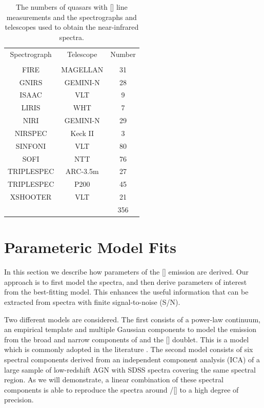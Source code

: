 \begin{table}
  \centering
  \small 
  \caption{The numbers of quasars with [] line measurements and the spectrographs and telescopes used to obtain the near-infrared spectra.}
  \label{tab:specnums}
    \begin{tabular}{ccc} 
    \hline
    Spectrograph & Telescope & Number \\
                 &           & \\
    \hline
    FIRE         & MAGELLAN  & 31 \\
    GNIRS        & GEMINI-N  & 28 \\
    ISAAC        & VLT       & 9 \\
    LIRIS        & WHT       & 7 \\
    NIRI         & GEMINI-N  & 29 \\
    NIRSPEC      & Keck II   & 3 \\
    SINFONI      & VLT       & 80 \\
    SOFI         & NTT       & 76 \\
    TRIPLESPEC   & ARC-3.5m  & 27 \\
    TRIPLESPEC   & P200      & 45 \\
    XSHOOTER     & VLT       & 21 \\
    \hline
    & & 356 \\
    \hline
    \end{tabular}
\end{table} 

\section{Parameteric Model Fits}

In this section we describe how parameters of the [] emission are derived. 
Our approach is to first model the spectra, and then derive parameters of interest from the best-fitting model. 
This enhances the useful information that can be extracted from spectra with finite signal-to-noise (S/N). 

Two different models are considered.
The first consists of a power-law continuum, an empirical  template and multiple Gaussian components to model the emission from the broad and narrow components of \hb and the [] doublet. 
This is a model which is commonly adopted in the literature \citep[e.g.][]{shen11}. 
The second model consists of six spectral components derived from an independent component analysis (ICA) of a large sample of low-redshift AGN with SDSS spectra covering the same spectral region.
As we will demonstrate, a linear combination of these spectral components is able to reproduce the spectra around \hbns/[] to a high degree of precision.  

